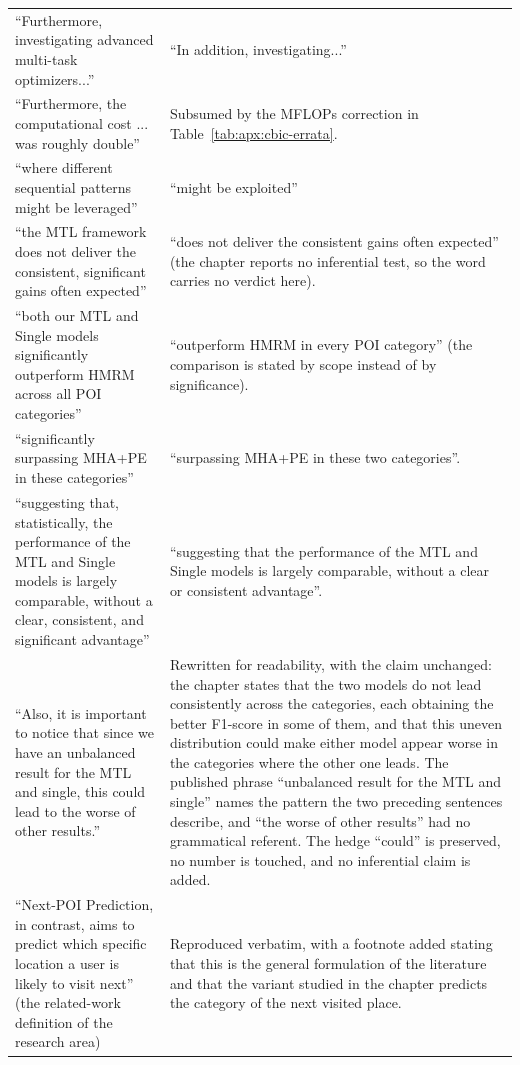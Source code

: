 \begin{table}[htb]
\begin{tabular}{@{}p{}p{}@{}}
``Furthermore, investigating advanced multi-task optimizers...'' &
``In addition, investigating...'' \\
``Furthermore, the computational cost ... was roughly double'' &
Subsumed by the MFLOPs correction in Table~\ref{tab:apx:cbic-errata}. \\
``where different sequential patterns might be leveraged'' &
``might be exploited'' \\
\addlinespace
``the MTL framework does not deliver the consistent, significant gains often
expected'' &
``does not deliver the consistent gains often expected'' (the chapter reports no
inferential test, so the word carries no verdict here). \\
``both our MTL and Single models significantly outperform HMRM across all POI
categories'' &
``outperform HMRM in every POI category'' (the comparison is stated by scope instead of
by significance). \\
``significantly surpassing MHA+PE in these categories'' &
``surpassing MHA+PE in these two categories''. \\
``suggesting that, statistically, the performance of the MTL and Single models is
largely comparable, without a clear, consistent, and significant advantage'' &
``suggesting that the performance of the MTL and Single models is largely comparable,
without a clear or consistent advantage''. \\
\addlinespace
``Also, it is important to notice that since we have an unbalanced result for the MTL
and single, this could lead to the worse of other results.'' &
Rewritten for readability, with the claim unchanged: the chapter states that the two
models do not lead consistently across the categories, each obtaining the better
F1-score in some of them, and that this uneven distribution could make either model
appear worse in the categories where the other one leads. The published phrase
``unbalanced result for the MTL and single'' names the pattern the two preceding
sentences describe, and ``the worse of other results'' had no grammatical referent. The
hedge ``could'' is preserved, no number is touched, and no inferential claim is added. \\
\addlinespace
``Next-POI Prediction, in contrast, aims to predict which specific location a user is
likely to visit next'' (the related-work definition of the research area) &
Reproduced verbatim, with a footnote added stating that this is the general formulation
of the literature and that the variant studied in the chapter predicts the category of
the next visited place. \\
\bottomrule
\end{tabular}
\end{table}
